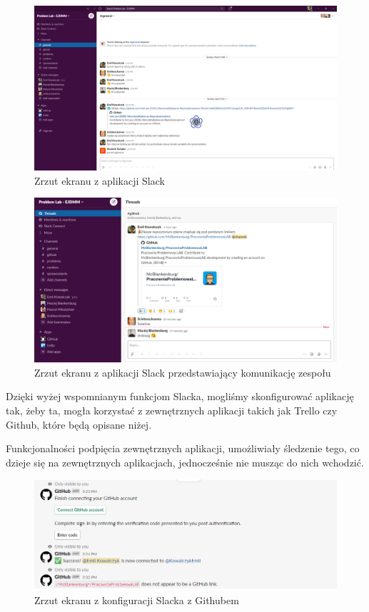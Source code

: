 \documentclass{article}
\begin{document}
		\begin{figure}[!h]
			\centering
			\includegraphics[scale=0.23]{Slack.png}
			\caption{Zrzut ekranu z aplikacji Slack}
		\end{figure}
		
		\begin{figure}[!h]
			\centering
			\includegraphics[scale=0.35]{Thread.png}
			\caption{Zrzut ekranu z aplikacji Slack przedstawiający komunikację zespołu}
		\end{figure}
		
Dzięki wyżej wspomnianym funkcjom Slacka, mogliśmy skonfigurować aplikację tak, żeby ta, mogła korzystać z zewnętrznych aplikacji takich jak Trello czy Github, które będą opisane niżej. 

Funkcjonalności podpięcia zewnętrznych aplikacji, umożliwiały śledzenie tego, co dzieje się na zewnętrznych aplikacjach, jednocześnie nie musząc do nich wchodzić. 

		\begin{figure}[!h]
			\centering
			\includegraphics[scale=0.45]{Github.png}
			\caption{Zrzut ekranu z konfiguracji Slacka z Githubem}
		\end{figure}
\end{document}
